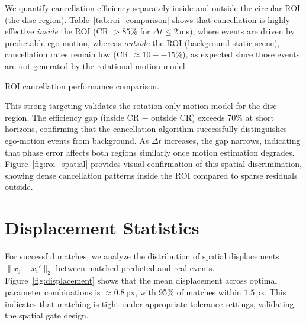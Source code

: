 We quantify cancellation efficiency separately inside and outside the circular ROI (the disc region). Table~\ref{tab:roi_comparison} shows that cancellation is highly effective \emph{inside} the ROI (CR $> 85\%$ for $\Delta t \leq 2$\,ms), where events are driven by predictable ego-motion, whereas \emph{outside} the ROI (background static scene), cancellation rates remain low (CR $\approx 10--15\%$), as expected since those events are not generated by the rotational motion model.

\begin{table}[t]
  \centering
  \caption{ROI cancellation performance comparison.}
  \label{tab:roi_comparison}
  
\end{table}


This strong targeting validates the rotation-only motion model for the disc region. The efficiency gap (inside CR $-$ outside CR) exceeds 70\% at short horizons, confirming that the cancellation algorithm successfully distinguishes ego-motion events from background. As $\Delta t$ increases, the gap narrows, indicating that phase error affects both regions similarly once motion estimation degrades. Figure~\ref{fig:roi_spatial} provides visual confirmation of this spatial discrimination, showing dense cancellation patterns inside the ROI compared to sparse residuals outside.

\section{Displacement Statistics}

For successful matches, we analyze the distribution of spatial displacements $\|x_j - x_i'\|_2$ between matched predicted and real events. Figure~\ref{fig:displacement} shows that the mean displacement across optimal parameter combinations is $\approx 0.8$\,px, with 95\% of matches within $1.5$\,px. This indicates that matching is tight under appropriate tolerance settings, validating the spatial gate design.

